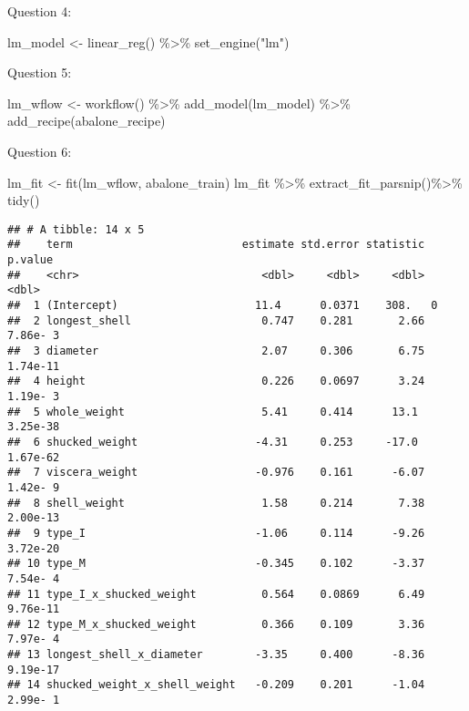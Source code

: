 \documentclass[
]{article}
\newenvironment{Shaded}{\begin{snugshade}}{\end{snugshade}}
\newcommand{\FunctionTok}[1]{\textcolor[rgb]{0.00,0.00,0.00}{#1}}
\newcommand{\NormalTok}[1]{#1}
\newcommand{\OtherTok}[1]{\textcolor[rgb]{0.56,0.35,0.01}{#1}}
\newcommand{\SpecialCharTok}[1]{\textcolor[rgb]{0.00,0.00,0.00}{#1}}
\newcommand{\StringTok}[1]{\textcolor[rgb]{0.31,0.60,0.02}{#1}}
\begin{document}
\n

Question 4:

\begin{Shaded}
\begin{Highlighting}[]
\NormalTok{lm\_model }\OtherTok{\textless{}{-}} \FunctionTok{linear\_reg}\NormalTok{() }\SpecialCharTok{\%\textgreater{}\%}
  \FunctionTok{set\_engine}\NormalTok{(}\StringTok{"lm"}\NormalTok{)}
\end{Highlighting}
\end{Shaded}

\n

Question 5:

\begin{Shaded}
\begin{Highlighting}[]
\NormalTok{lm\_wflow }\OtherTok{\textless{}{-}} \FunctionTok{workflow}\NormalTok{() }\SpecialCharTok{\%\textgreater{}\%} 
  \FunctionTok{add\_model}\NormalTok{(lm\_model) }\SpecialCharTok{\%\textgreater{}\%} 
  \FunctionTok{add\_recipe}\NormalTok{(abalone\_recipe)}
\end{Highlighting}
\end{Shaded}

\n

Question 6:

\begin{Shaded}
\begin{Highlighting}[]
\NormalTok{lm\_fit }\OtherTok{\textless{}{-}} \FunctionTok{fit}\NormalTok{(lm\_wflow, abalone\_train)}
\NormalTok{lm\_fit }\SpecialCharTok{\%\textgreater{}\%}
  \FunctionTok{extract\_fit\_parsnip}\NormalTok{()}\SpecialCharTok{\%\textgreater{}\%}
  \FunctionTok{tidy}\NormalTok{()}
\end{Highlighting}
\end{Shaded}

\begin{verbatim}
## # A tibble: 14 x 5
##    term                          estimate std.error statistic  p.value
##    <chr>                            <dbl>     <dbl>     <dbl>    <dbl>
##  1 (Intercept)                     11.4      0.0371    308.   0       
##  2 longest_shell                    0.747    0.281       2.66 7.86e- 3
##  3 diameter                         2.07     0.306       6.75 1.74e-11
##  4 height                           0.226    0.0697      3.24 1.19e- 3
##  5 whole_weight                     5.41     0.414      13.1  3.25e-38
##  6 shucked_weight                  -4.31     0.253     -17.0  1.67e-62
##  7 viscera_weight                  -0.976    0.161      -6.07 1.42e- 9
##  8 shell_weight                     1.58     0.214       7.38 2.00e-13
##  9 type_I                          -1.06     0.114      -9.26 3.72e-20
## 10 type_M                          -0.345    0.102      -3.37 7.54e- 4
## 11 type_I_x_shucked_weight          0.564    0.0869      6.49 9.76e-11
## 12 type_M_x_shucked_weight          0.366    0.109       3.36 7.97e- 4
## 13 longest_shell_x_diameter        -3.35     0.400      -8.36 9.19e-17
## 14 shucked_weight_x_shell_weight   -0.209    0.201      -1.04 2.99e- 1
\end{verbatim}
\end{document}
